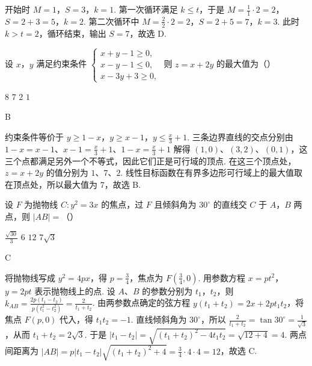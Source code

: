 \begin{solution}
开始时 \(M=1\)，\(S=3\)，\(k=1\). 第一次循环满足 \(k\leqslant t\)，于是 \(M=\frac{1}{1}\cdot2=2\)，\(S=2+3=5\)，\(k=2\). 第二次循环中 \(M=\frac{2}{2}\cdot2=2\)，\(S=2+5=7\)，\(k=3\). 此时 \(k>t=2\)，循环结束，输出 \(S=7\)，故选 D.
\end{solution}

\begin{problem}
设 \(x\)，\(y\) 满足约束条件 \(\begin{cases}
x+y-1\geqslant 0,\\
x-y-1\leqslant 0,\\
x-3y+3\geqslant 0,
\end{cases}\) 则 \(z=x+2y\) 的最大值为（\quad）

\choices
    {\(8\)}
    {\(7\)}
    {\(2\)}
    {\(1\)}
\end{problem}

\begin{answer}
B
\end{answer}

\begin{solution}
约束条件等价于 \(y\geqslant1-x\)，\(y\geqslant x-1\)，\(y\leqslant\frac{x}{3}+1\). 三条边界直线的交点分别由
\(1-x=x-1\)、\(x-1=\frac{x}{3}+1\)、\(1-x=\frac{x}{3}+1\) 解得 \((1,0)\)、\((3,2)\)、\((0,1)\)，这三个点都满足另外一个不等式，因此它们正是可行域的顶点.
在这三个顶点处，\(z=x+2y\) 的值分别为 \(1\)、\(7\)、\(2\). 线性目标函数在有界多边形可行域上的最大值取在顶点处，所以最大值为 \(7\)，故选 B.
\end{solution}

\begin{problem}
设 \(F\) 为抛物线 \(C:y^2=3x\) 的焦点，过 \(F\) 且倾斜角为 \(30^{\circ}\) 的直线交 \(C\) 于 \(A\)，\(B\) 两点，则 \(|AB|=\)（\quad）

\choices
    {\(\frac{\sqrt{30}}{3}\)}
    {\(6\)}
    {\(12\)}
    {\(7\sqrt{3}\)}
\end{problem}

\begin{answer}
C
\end{answer}

\begin{solution}
将抛物线写成 \(y^2=4px\)，得 \(p=\frac34\)，焦点为 \(F\left(\frac34,0\right)\). 用参数方程 \(x=pt^2\)，\(y=2pt\) 表示抛物线上的点. 设 \(A\)、\(B\) 的参数分别为 \(t_1\)，\(t_2\)，则
\(\displaystyle k_{AB}=\frac{2p(t_1-t_2)}{p(t_1^2-t_2^2)}=\frac{2}{t_1+t_2}\).
由两参数点确定的弦方程 \(y(t_1+t_2)=2x+2pt_1t_2\)，将焦点 \(F\left(p,0\right)\) 代入，得 \(t_1t_2=-1\).
直线倾斜角为 \(30^{\circ}\)，所以
\(\displaystyle\frac{2}{t_1+t_2}=\tan30^{\circ}=\frac{1}{\sqrt3}\)，从而 \(t_1+t_2=2\sqrt3\). 于是
\(\lvert t_1-t_2\rvert=\sqrt{(t_1+t_2)^2-4t_1t_2}=\sqrt{12+4}=4\).
两点间距离为
\(\displaystyle|AB|=p|t_1-t_2|\sqrt{(t_1+t_2)^2+4}=\frac34\cdot4\cdot4=12\)，故选 C.
\end{solution}


